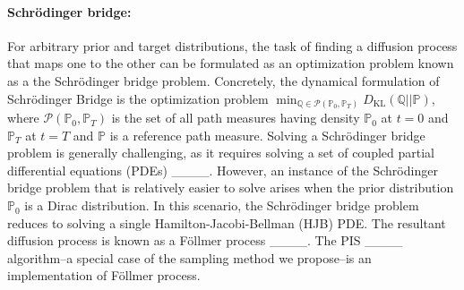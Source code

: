 \paragraph{Schr\"odinger bridge:}
For arbitrary prior and target distributions, the task of finding a diffusion process that maps one to the other can be formulated as an optimization problem known as a the Schr\"odinger bridge problem. Concretely, the dynamical formulation of Schr\"odinger Bridge is the optimization problem $\min_{\mathbb{Q}\in\mathcal{P}(\mathbb{P}_0,\mathbb{P}_T)} D_{\text{KL}}(\mathbb{Q}||\mathbb{P})$, where $\mathcal{P}(\mathbb{P}_0,\mathbb{P}_T)$ is the set of all path measures having density $\mathbb{P}_0$ at $t=0$ and $\mathbb{P}_T$ at $t=T$ and $\mathbb{P}$ is a reference path measure. Solving a Schr\"odinger bridge problem is generally challenging, as it requires solving a set of coupled partial differential equations (PDEs) ____. However, an instance of the Schrödinger bridge problem that is relatively easier to solve arises when the prior distribution $\mathbb{P}_0$ is a Dirac distribution. In this scenario, the Schrödinger bridge problem reduces to solving a single Hamilton-Jacobi-Bellman (HJB) PDE. The resultant diffusion process is known as a F\"ollmer process ____. The PIS ____ algorithm--a special case of the sampling method we propose--is an implementation of F\"ollmer process.